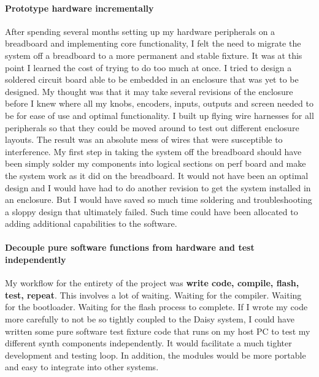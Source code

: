 \documentclass[acmlarge,screen]{acmart}
\begin{document}
	\paragraph{Prototype hardware incrementally} After spending several months setting up my hardware peripherals on a breadboard and implementing core functionality, I felt the need to migrate the system off a breadboard to a more permanent and stable fixture. It was at this point I learned the cost of trying to do too much at once. I tried to design a soldered circuit board able to be embedded in an enclosure that was yet to be designed. My thought was that it may take several revisions of the enclosure before I knew where all my knobs, encoders, inputs, outputs and screen needed to be for ease of use and optimal functionality. I built up flying wire harnesses for all peripherals so that they could be moved around to test out different enclosure layouts. The result was an absolute mess of wires that were susceptible to interference. My first step in taking the system off the breadboard should have been simply solder my components into logical sections on perf board and make the system work as it did on the breadboard. It would not have been an optimal design and I would have had to do another revision to get the system installed in an enclosure. But I would have saved so much time soldering and troubleshooting a sloppy design that ultimately failed. Such time could have been allocated to adding additional capabilities to the software.
	
	\paragraph{Decouple pure software functions from hardware and test independently} My workflow for the entirety of the project was \textbf{write code, compile, flash, test, repeat}. This involves a lot of waiting. Waiting for the compiler. Waiting for the bootloader. Waiting for the flash process to complete. If I wrote my code more carefully to not be so tightly coupled to the Daisy system, I could have written some pure software test fixture code that runs on my host PC to test my different synth components independently. It would facilitate a much tighter development and testing loop. In addition, the modules would be more portable and easy to integrate into other systems.
	
\end{document}
